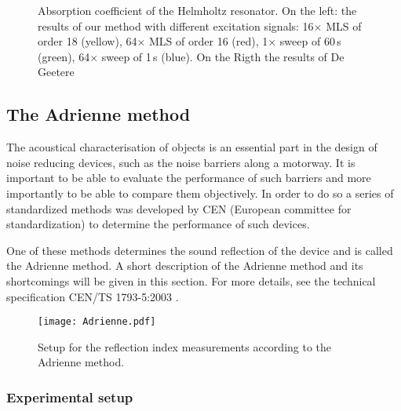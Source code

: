 \begin{figure}[h!]
  \begin{center}
  \hspace{-5cm}
  \hspace{-5cm}
  \caption{Absorption coefficient of the Helmholtz resonator. On the left: the results of our method with different excitation signals: 16$\times$ MLS 	of order 18 (yellow), 64$\times$ MLS of order 16 (red), 1$\times$ sweep of 60\,s (green), 64$\times$ sweep of 1\,s (blue). On the Rigth the results 	of De Geetere\cite[p.84]{Geetere}}\label{alles}
  \end{center}
\end{figure}

\subsection{The Adrienne method}
The acoustical characterisation of objects is an essential part in the design of noise reducing devices, such as the noise barriers along a motorway. It is important to be able to evaluate the performance of such barriers and more importantly to be able to compare them objectively. In order to do so a series of standardized methods was developed by CEN (European committee for standardization) to determine the performance of such devices.

One of these methods determines the sound reflection of the device and is called the Adrienne method. A short description of the Adrienne method and its shortcomings will be given in this section. For more details, see the technical specification CEN/TS 1793-5:2003 \cite{Adrienne}.
\begin{wrapfigure}{R}[0.08\textwidth]{0.4\textwidth}
  \centering
    \texttt{[image: Adrienne.pdf]}
  \caption{Setup for the reflection index measurements according to the Adrienne method.\label{fig: adrienne}}
  
\end{wrapfigure}


\subsubsection{Experimental setup}

